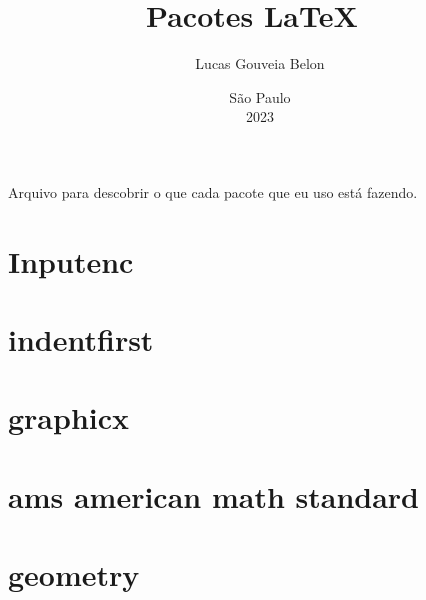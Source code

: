 \documentclass{article}
\begin{document}
\title{Pacotes \LaTeX\ }                %
\author{Lucas Gouveia Belon}            %
\date{\vspace{2.2cm}São Paulo\\2023}    %
\maketitle                              %

\tableofcontents                        %

Arquivo para descobrir o que cada pacote
que eu uso está fazendo.                

\section*{Inputenc}
\section*{indentfirst}
\section*{graphicx}
\section*{ams american math standard}
\section*{geometry}
\end{document}
